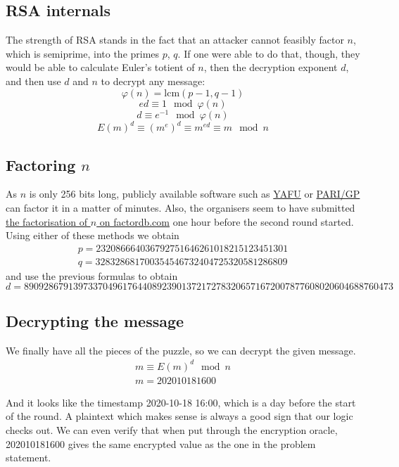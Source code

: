 \documentclass[11pt]{llncs}
\begin{document}
\subsection{RSA internals}
The strength of RSA stands in the fact that an attacker cannot feasibly factor $n$, which is semiprime, into the primes $p$, $q$. If one were able to do that, though, they would be able to calculate Euler's totient of $n$, then the decryption exponent $d$, and then use $d$ and $n$ to decrypt any message:
\[ \varphi(n) = \text{lcm}(p-1, q-1) \]
\[ ed \equiv 1 \mod \varphi(n) \]
\[ d \equiv e^{-1} \mod \varphi(n) \]
\[ E(m)^d \equiv (m^e)^d \equiv m^{ed} \equiv m \mod n \]

\subsection{Factoring $n$}
As $n$ is only 256 bits long, publicly available software such as \href{https://sourceforge.net/projects/yafu/}{YAFU} or \href{https://pari.math.u-bordeaux.fr/}{PARI/GP} can factor it in a matter of minutes. Also, the organisers seem to have submitted \href{http://factordb.com/index.php?query=76200708443433250012501342992033571586971760218934756930058661627867825188509}{the factorisation of $n$ on factordb.com} one hour before the second round started. Using either of these methods we obtain
\[ \begin{aligned}
p = 232086664036792751646261018215123451301\\
q = 328328681700354546732404725320581286809
\end{aligned} \]
and use the previous formulas to obtain \small 
\[ d = 890928679139733704961764408923901372172783206571672007877608020604688760473 \]
\normalsize

\subsection{Decrypting the message}
We finally have all the pieces of the puzzle, so we can decrypt the given message.
\[ \begin{aligned}
m \equiv E(m)^d \mod n \\
m = 202010181600
\end{aligned} \]

And it looks like the timestamp 2020-10-18 16:00, which is a day before the start of the round. A plaintext which makes sense is always a good sign that our logic checks out. We can even verify that when put through the encryption oracle, 202010181600 gives the same encrypted value as the one in the problem statement.
\end{document}
